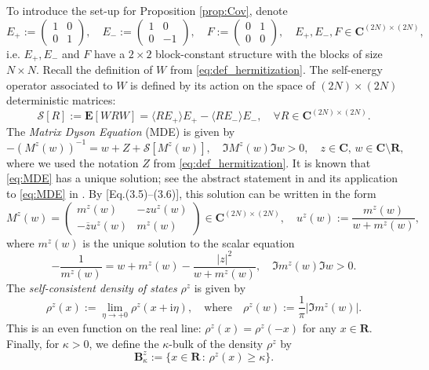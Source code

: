 \documentclass[10pt]{amsart}
\numberwithin{equation}{section}
\newcommand{\E}{\mathbf{E}}
\newcommand{\R}{\mathbf{R}}
\newcommand{\C}{\mathbf{C}}
\newcommand{\ii}{\mathrm{i}}
\begin{document}
To introduce the set-up for Proposition \ref{prop:Cov}, denote
\begin{equation}
E_+:=\begin{pmatrix}
1&0\\0&1
\end{pmatrix},\quad 
E_-:=\begin{pmatrix}
1&0\\0&-1
\end{pmatrix},\quad 
F:=\begin{pmatrix}
0&1\\0&0
\end{pmatrix},\quad E_+,E_-,F\in \C^{(2N)\times (2N)},
\end{equation}
i.e. $E_+,E_-$ and $F$ have a $2\times 2$ block-constant structure with the blocks of size $N\times N$. Recall the definition of $W$ from \eqref{eq:def_hermitization}. The self-energy operator associated to $W$ is defined by its action on the space of $(2N)\times (2N)$ deterministic matrices:
\begin{equation}
\mathcal{S}[R]:=\E[WRW] = \langle RE_+\rangle E_+-\langle RE_-\rangle E_-, \quad \forall R\in \C^{(2N)\times (2N)}.
\label{eq:def_S}
\end{equation}
The \emph{Matrix Dyson Equation} (MDE) is given by
\begin{equation}
-(M^z(w))^{-1} = w+Z+\mathcal{S}[M^z(w)],\quad \Im M^z(w)\Im w>0,\quad z\in\C,\, w\in\C\setminus\R,
\label{eq:MDE}
\end{equation}
where we used the notation $Z$ from \eqref{eq:def_hermitization}. It is known that \eqref{eq:MDE} has a unique solution; see the abstract statement in \cite{Helton07} and its application to \eqref{eq:MDE} in \cite[Lemma 2.2]{loc_circ_law18}. By [Eq.(3.5)--(3.6)]\cite{loc_circ_law18}, this solution can be written in the form 
\begin{equation}
M^z(w)=
\begin{pmatrix}
m^z(w)&-zu^z(w)\\ -\overline{z}u^z(w)&m^z(w)
\end{pmatrix}\in \C^{(2N)\times (2N)},\quad 
u^z(w):=\frac{m^z(w)}{w+m^z(w)},
\label{eq:M}
\end{equation}
where $m^z(w)$ is the unique solution to the scalar equation
\begin{equation}
-\frac{1}{m^z(w)} = w+m^z(w) -\frac{|z|^2}{w+m^z(w)},\quad \Im m^z(w)\Im w>0.
\label{eq:m}
\end{equation}
The \emph{self-consistent density of states} $\rho^z$ is given by 
\begin{equation}
\rho^z(x):=\lim_{\eta\to +0} \rho^z(x+\ii\eta),\quad \text{where}\quad \rho^z(w):=\frac{1}{\pi}\left\vert\Im m^z(w)\right\vert.
\label{eq:def_rho}
\end{equation}
This is an even function on the real line: $\rho^z(x)=\rho^z(-x)$ for any $x\in\R$. Finally, for $\kappa>0$, we define the $\kappa$-bulk of the density $\rho^z$ by
\begin{equation}
\mathbf{B}_\kappa^z:=\{x\in\R\,:\, \rho^z(x)\ge \kappa\}.
\label{eq:def_bulk}
\end{equation}
\end{document}
